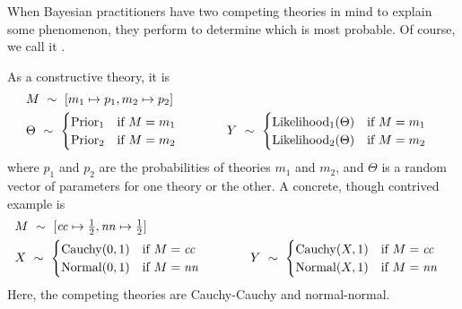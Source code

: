 When Bayesian practitioners have two competing theories in mind to explain some phenomenon, they perform  to determine which is most probable.
Of course, we call it .

As a constructive theory, it is
\begin{equation}
\begin{aligned}
	&M \ \sim\ [m_1 \mapsto p_1, m_2 \mapsto p_2] \\
	&\begin{aligned}
	&\Theta \ \sim\ 
		\begin{cases}
			\mathrm{Prior_1} & \text{if } M = m_1 \\
			\mathrm{Prior_2} & \text{if } M = m_2
		\end{cases}
	\end{aligned}
	&\tab\tab
	\begin{aligned}
	&Y \ \sim\ 
		\begin{cases}
			\mathrm{Likelihood_1}(\Theta) & \text{if } M = m_1 \\
			\mathrm{Likelihood_2}(\Theta) & \text{if } M = m_2
		\end{cases}
	\end{aligned}
\end{aligned}
\end{equation}
where $p_1$ and $p_2$ are the probabilities of theories $m_1$ and $m_2$, and $\Theta$ is a random vector of parameters for one theory or the other.
A concrete, though contrived example is
\begin{equation}
\begin{aligned}
	&M \ \sim\ [\mathit{cc} \mapsto \tfrac{1}{2}, \mathit{nn} \mapsto \tfrac{1}{2}] \\
	&\begin{aligned}
	&X \ \sim\ 
		\begin{cases}
			\mathrm{Cauchy}(0,1) & \text{if } M = \mathit{cc} \\
			\mathrm{Normal}(0,1) & \text{if } M = \mathit{nn}
		\end{cases}
	\end{aligned}
	&\tab\tab
	\begin{aligned}
	&Y \ \sim\ 
		\begin{cases}
			\mathrm{Cauchy}(X,1) & \text{if } M = \mathit{cc} \\
			\mathrm{Normal}(X,1) & \text{if } M = \mathit{nn}
		\end{cases}
	\end{aligned}
\end{aligned}
\end{equation}
Here, the competing theories are Cauchy-Cauchy and normal-normal.

